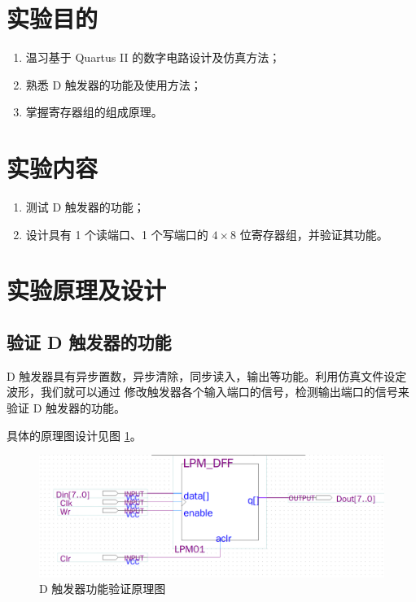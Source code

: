 \section{实验目的}

\begin{enumerate}
    \item 温习基于 Quartus II 的数字电路设计及仿真方法；
    \item 熟悉 D 触发器的功能及使用方法；
    \item 掌握寄存器组的组成原理。
\end{enumerate}

\section{实验内容}

\begin{enumerate}
    \item 测试 D 触发器的功能；
    \item 设计具有 1 个读端口、1 个写端口的 $4 \times 8$ 位寄存器组，并验证其功能。
\end{enumerate}

\section{实验原理及设计}

\subsection{验证 D 触发器的功能}

D 触发器具有异步置数，异步清除，同步读入，输出等功能。利用仿真文件设定波形，我们就可以通过
修改触发器各个输入端口的信号，检测输出端口的信号来验证 D 触发器的功能。

具体的原理图设计见图 \ref{figure:1.1-design}。

\begin{figure}[h]
    \centering
    \caption{D 触发器功能验证原理图}
    \label{figure:1.1-design}
    \includegraphics[scale=0.3]{pics/1.1-design.png}
\end{figure}

